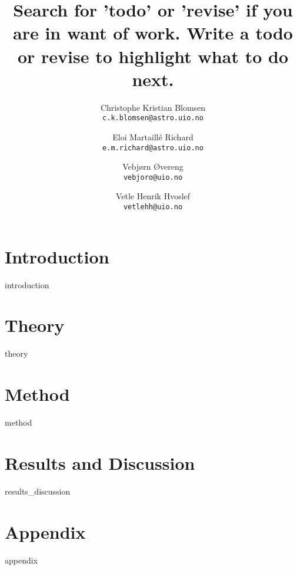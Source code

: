 \documentclass[a4paper,10pt,english]{article}
\title{Search for 'todo' or 'revise' if you are in want of work.
Write a todo or revise to highlight what to do next.}
\author{Christophe Kristian Blomsen\\
        \texttt{c.k.blomsen@astro.uio.no}
        \and
        Eloi Martaillé Richard\\
        \texttt{e.m.richard@astro.uio.no}
        \and
        Vebjørn Øvereng\\
        \texttt{vebjoro@uio.no}
        \and
        Vetle Henrik Hvoslef\\
        \texttt{vetlehh@uio.no}}
\begin{document}
  \maketitle


\section{Introduction}
{introduction}
\section{Theory}
{theory}

\section{Method}
{method}
\newpage
\newpage
\section{Results and Discussion}\label{sec:results}
{results_discussion}

\section{Appendix}\label{sec:app}
{appendix}

\end{document}
